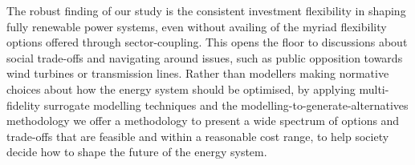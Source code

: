 The robust finding of our study is the consistent investment flexibility in
shaping fully renewable power systems, even without availing of the myriad
flexibility options offered through sector-coupling. This opens the floor to
discussions about social trade-offs and navigating around issues, such as public
opposition towards wind turbines or transmission lines. Rather than modellers
making normative choices about how the energy system should be optimised, by
applying multi-fidelity surrogate modelling techniques and the
modelling-to-generate-alternatives methodology we offer a methodology to present
a wide spectrum of options and trade-offs that are feasible and within a
reasonable cost range, to help society decide how to shape the future of the
energy system.



